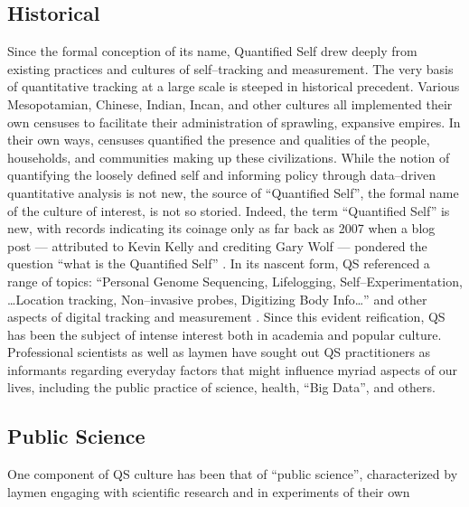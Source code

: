 \documentclass{article}
\begin{document}
\subsection*{Historical}
Since the formal conception of its name,
Quantified Self drew deeply from existing practices and cultures of self--tracking and measurement.
The very basis of quantitative tracking at a large scale is steeped in historical precedent.
Various Mesopotamian,
Chinese,
Indian,
Incan,
and other cultures all implemented their own censuses to facilitate their administration of sprawling,
expansive empires.
In their own ways,
censuses quantified the presence and qualities of the people,
households,
and communities making up these civilizations.
While the notion of quantifying the loosely defined self and informing policy through data--driven quantitative analysis is not new,
the source of ``Quantified Self'',
the formal name of the culture of interest,
is not so storied.
Indeed,
the term ``Quantified Self'' is new,
with records indicating its coinage only as far back as 2007 when a blog post
--- attributed to Kevin Kelly and crediting Gary Wolf ---
pondered the question ``what is the Quantified Self''
\citep{whatisQS}.
In its nascent form,
QS referenced a range of topics:
``Personal Genome Sequencing,
Lifelogging,
Self--Experimentation,
\dots Location tracking,
Non--invasive probes,
Digitizing Body Info\dots'' and other aspects of digital tracking and measurement
\citep{whatisQS}.
Since this evident reification,
QS has been the subject of intense interest both in academia and popular culture.
Professional scientists as well as laymen have sought out QS practitioners as informants regarding everyday factors that might influence myriad aspects of our lives,
including the public practice of science,
health,
``Big Data'',
and others.

\subsection*{Public Science}
One component of QS culture has been that of ``public science'',
characterized by laymen engaging with scientific research and in experiments of their own
\end{document}
